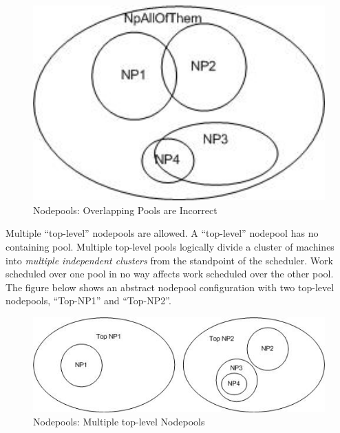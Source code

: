     \begin{figure}[H]
      \centering
      \includegraphics[bb=0 0 241 161, width=5.5in]{images/Nodepool2.jpg}
      \caption{Nodepools: Overlapping Pools are Incorrect}
      \label{fig:Nodepools2}
    \end{figure}

    Multiple ``top-level'' nodepools are allowed.  A ``top-level'' nodepool has no containing
    pool.  Multiple top-level pools logically divide a cluster of machines into {\em multiple
      independent clusters} from the standpoint of the scheduler.  Work scheduled over one
    pool in no way affects work scheduled over the other pool.  The figure below shows an
    abstract nodepool configuration with two top-level nodepools, ``Top-NP1'' and ``Top-NP2''.
    \begin{figure}[H]
      \centering
      \includegraphics[bb=0 0 496 161, width=5.5in]{images/Nodepool3.jpg}
      \caption{Nodepools: Multiple top-level Nodepools}
      \label{fig:Nodepools3}
    \end{figure}

